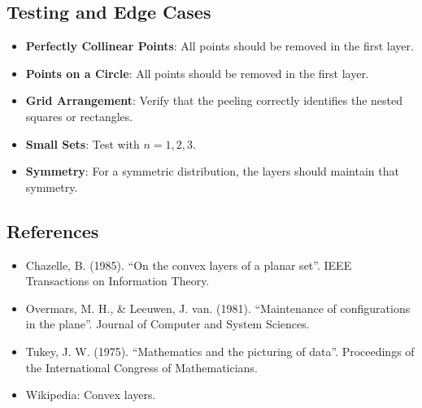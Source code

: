 \subsection{Testing and Edge Cases}

\begin{itemize}
\item \textbf{Perfectly Collinear Points}: All points should be removed in the first layer.
\item \textbf{Points on a Circle}: All points should be removed in the first layer.
\item \textbf{Grid Arrangement}: Verify that the peeling correctly identifies the nested squares or rectangles.
\item \textbf{Small Sets}: Test with $n=1, 2, 3$.
\item \textbf{Symmetry}: For a symmetric distribution, the layers should maintain that symmetry.
\end{itemize}

\subsection{References}

\begin{itemize}
\item Chazelle, B. (1985). ``On the convex layers of a planar set''. IEEE Transactions on Information Theory.
\item Overmars, M. H., \& Leeuwen, J. van. (1981). ``Maintenance of configurations in the plane''. Journal of Computer and System Sciences.
\item Tukey, J. W. (1975). ``Mathematics and the picturing of data''. Proceedings of the International Congress of Mathematicians.
\item Wikipedia: Convex layers.
\end{itemize}



